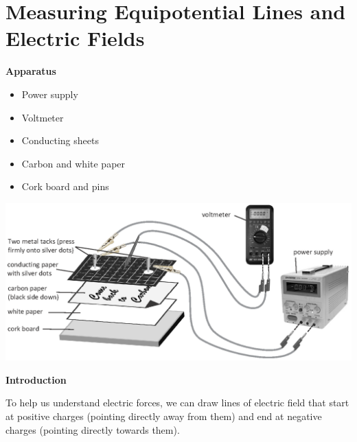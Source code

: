 \section{Measuring Equipotential Lines and Electric Fields}


\makelabheader %

\medskip
\textbf{Apparatus}
\begin{itemize}[nosep]
\item Power supply
\item Voltmeter
\item Conducting sheets
\item Carbon and white paper
\item Cork board and pins
\end{itemize}

\vspace{-0.5in}
{\raggedleft \includegraphics[scale=0.9]{electric_fields_and_equipotential_lines/apparatus_picture.eps} \par}


\textbf{Introduction}

To help us understand electric forces, we can draw lines of electric field that start at positive charges (pointing directly away from them) and end at negative charges (pointing directly towards them).  


